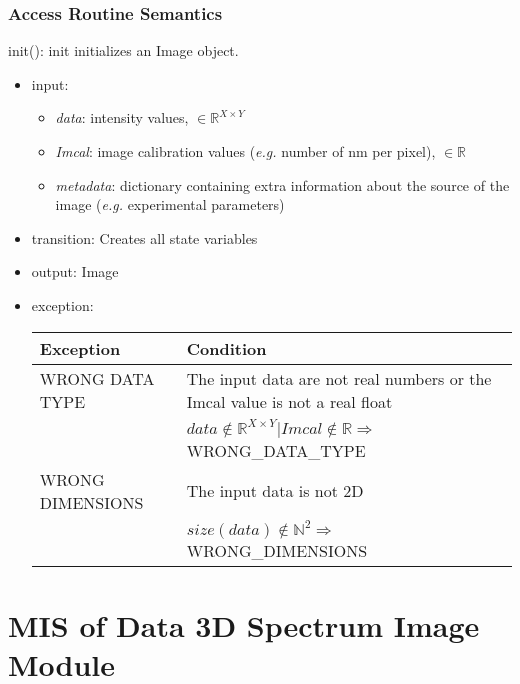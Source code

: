 \documentclass[12pt, titlepage]{article}
\begin{document}
\subsubsection{Access Routine Semantics}

\noindent init():
init initializes an Image object.
\begin{itemize}
    \item input:
    \begin{itemize}
        \item \textit{data}: intensity values, $\in \mathbb{R}^{X \times Y}$
        \item \textit{Imcal}: image calibration values (\textit{e.g.} number of
        \si{\nano\metre} per pixel), $\in \mathbb{R}$
        \item \textit{metadata}: dictionary containing extra information about
        the source of the image (\textit{e.g.} experimental parameters)
    \end{itemize}
    \item transition: Creates all state variables
    \item output: Image
    \item exception:
    \begin{center}
        \begin{tabular}{p{4cm} p{11.5cm}}
            \toprule[0.15em]
            \textbf{Exception} & \textbf{Condition}\\
            \midrule[0.1em]
            WRONG DATA TYPE & The input data are not real numbers or the Imcal
            value is not a real float\\
            & $data \notin \mathbb{R}^{X \times Y}  | Imcal \notin \mathbb{R}
            \Rightarrow$ WRONG\_DATA\_TYPE \\ 
            \midrule[0.05em]
            WRONG DIMENSIONS & The input data is not 2D\\
            & $size(data) \notin \mathbb{N}^2 \Rightarrow $ WRONG\_DIMENSIONS\\
            \bottomrule[0.15em]
        \end{tabular}
    \end{center}
\end{itemize}

\newpage
\section{MIS of Data 3D Spectrum Image Module} \label{Mod:SI}
\end{document}
